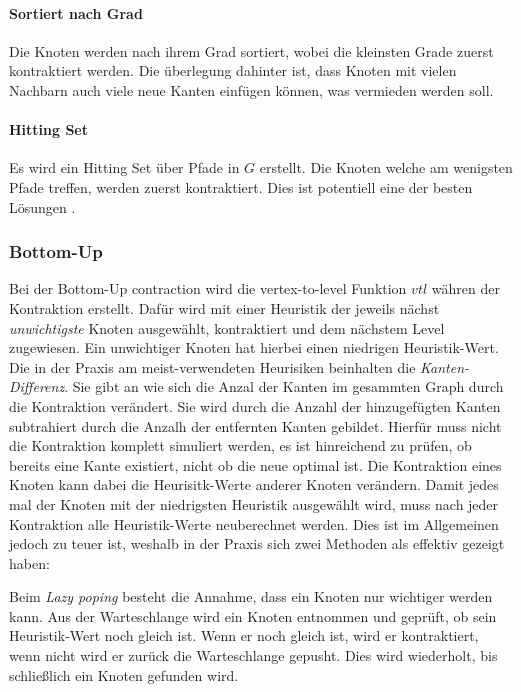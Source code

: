 \paragraph{Sortiert nach Grad}
Die Knoten werden nach ihrem Grad sortiert, wobei die kleinsten Grade zuerst kontraktiert werden.
Die überlegung dahinter ist, dass Knoten mit vielen Nachbarn auch viele neue Kanten einfügen können, was vermieden werden soll.

\paragraph{Hitting Set}
Es wird ein Hitting Set über Pfade in $G$ erstellt.
Die Knoten welche am wenigsten Pfade treffen, werden zuerst kontraktiert.
Dies ist potentiell eine der besten Lösungen .

\subsubsection{Bottom-Up}

Bei der Bottom-Up contraction wird die vertex-to-level Funktion ${vtl}$ währen der Kontraktion erstellt.
Dafür wird mit einer Heuristik der jeweils nächst \emph{unwichtigste} Knoten ausgewählt, kontraktiert und dem nächstem Level zugewiesen.
Ein unwichtiger Knoten hat hierbei einen niedrigen Heuristik-Wert.
Die in der Praxis am meist-verwendeten Heurisiken beinhalten die \emph{Kanten-Differenz}.
Sie gibt an wie sich die Anzal der Kanten im gesammten Graph durch die Kontraktion verändert.
Sie wird durch die Anzahl der hinzugefügten Kanten subtrahiert durch die Anzalh der entfernten Kanten gebildet.
Hierfür muss nicht die Kontraktion komplett simuliert werden, es ist hinreichend zu prüfen, ob bereits eine Kante existiert, nicht ob die neue optimal ist.
Die Kontraktion eines Knoten kann dabei die Heurisitk-Werte anderer Knoten verändern.
Damit jedes mal der Knoten mit der niedrigsten Heuristik ausgewählt wird, muss nach jeder Kontraktion alle Heuristik-Werte neuberechnet werden.
Dies ist im Allgemeinen jedoch zu teuer ist, weshalb in der Praxis sich zwei Methoden als effektiv gezeigt haben:

Beim \emph{Lazy poping} besteht die Annahme, dass ein Knoten nur wichtiger werden kann.
Aus der Warteschlange wird ein Knoten entnommen und geprüft, ob sein Heuristik-Wert noch gleich ist.
Wenn er noch gleich ist, wird er kontraktiert, wenn nicht wird er zurück die Warteschlange gepusht.
Dies wird wiederholt, bis schließlich ein Knoten gefunden wird.

